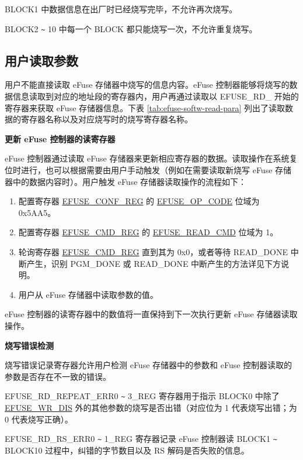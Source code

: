 \documentclass[main\_\_CN.tex]{subfiles}
\begin{document}
BLOCK1 中数据信息在出厂时已经烧写完毕，不允许再次烧写。

BLOCK2 \verb+~+ 10 中每一个 BLOCK 都只能烧写一次，不允许重复烧写。


\subsection{用户读取参数}
\label{sec:efuse-software-read-para}

用户不能直接读取 eFuse 存储器中烧写的信息内容。eFuse 控制器能够将烧写的数据信息读取到对应的地址段的寄存器内，用户再通过读取以 EFUSE\_RD\_ 开始的寄存器来获取 eFuse 存储器信息。下表 \ref{tab:efuse-softw-read-para} 列出了读取数据的寄存器名称以及对应烧写时的烧写寄存器名称。



{\bfseries 更新 eFuse 控制器的读寄存器}
\label{sec:efuse-update-reg}

eFuse 控制器通过读取 eFuse 存储器来更新相应寄存器的数据。读取操作在系统复位时进行，也可以根据需要由用户手动触发（例如在需要读取新烧写 eFuse 存储器中的数据内容时）。用户触发 eFuse 存储器读取操作的流程如下：
\begin{enumerate}
    \item 配置寄存器 \hyperref[regdesc:EFUSECONFREG]{EFUSE\_CONF\_REG} 的 \hyperref[fielddesc:EFUSEOPCODE]{EFUSE\_OP\_CODE} 位域为 0x5AA5。
    \item 配置寄存器 \hyperref[regdesc:EFUSECMDREG]{EFUSE\_CMD\_REG} 的 \hyperref[fielddesc:EFUSEREADCMD]{EFUSE\_READ\_CMD} 位域为 1。
    \item 轮询寄存器 \hyperref[regdesc:EFUSECMDREG]{EFUSE\_CMD\_REG} 直到其为 0x0，或者等待 READ\_DONE 中断产生，识别 PGM\_DONE 或 READ\_DONE 中断产生的方法详见下方说明。
    \item 用户从 eFuse 存储器中读取参数的值。
\end{enumerate}
eFuse 控制器的读寄存器中的数值将一直保持到下一次执行更新 eFuse 存储器读取操作。

{\bfseries 烧写错误检测}

烧写错误记录寄存器允许用户检测 eFuse 存储器中的参数和 eFuse 控制器读取的参数是否存在不一致的错误。

EFUSE\_RD\_REPEAT\_ERR0 \verb+~+ 3\_REG 寄存器用于指示 BLOCK0 中除了 \hyperref[fielddesc:EFUSEWRDIS]{EFUSE\_WR\_DIS} 外的其他参数的烧写是否出错（对应位为 1 代表烧写出错；为 0 代表烧写正确）。

EFUSE\_RD\_RS\_ERR0 \verb+~+ 1\_REG 寄存器记录 eFuse 控制器读 BLOCK1 \verb+~+ BLOCK10 过程中，纠错的字节数目以及 RS 解码是否失败的信息。
\end{document}
